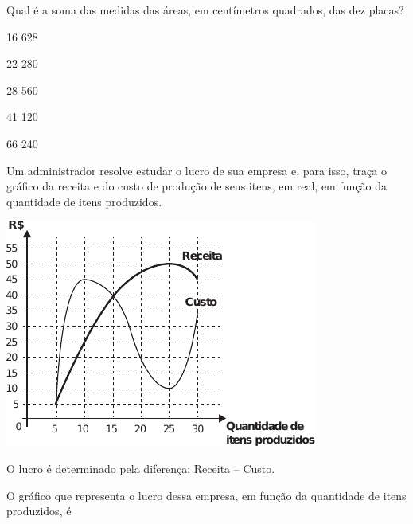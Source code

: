 Qual é a soma das medidas das áreas, em centímetros
quadrados, das dez placas?

\begin{alternativas}
\item 16 628
\item 22 280
\item 28 560
\item 41 120
\item 66 240
\end{alternativas}

\onecolumn

\questao \label{mat-first} %
Um administrador resolve estudar o lucro de sua empresa e, para isso, traça o gráfico da receita 
e do custo de produção de seus itens, em real, em função da quantidade de itens produzidos.

\begin{center}
\includegraphics[width=.4\textwidth]{subareas/matematica/enem_2020-136-grafico.pdf}
\end{center}

O lucro é determinado pela diferença: Receita – Custo.

O gráfico que representa o lucro dessa empresa, em função da quantidade de itens produzidos, é

